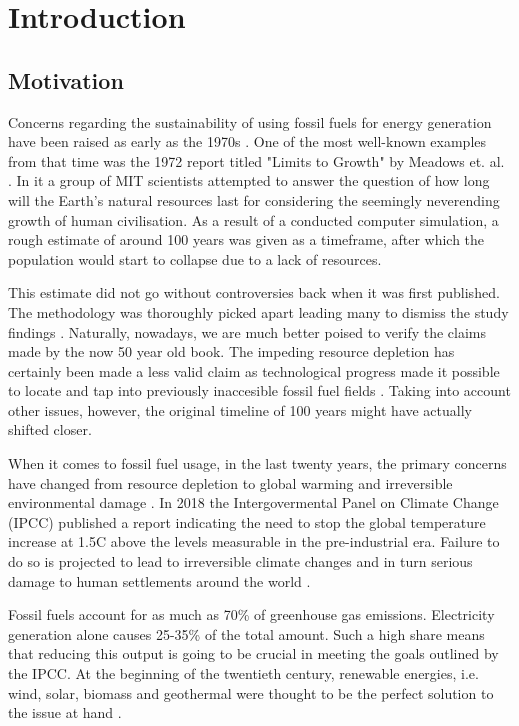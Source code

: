 \section{Introduction}


\subsection{Motivation}


Concerns regarding the sustainability of using fossil fuels for energy generation
have been raised as early as the 1970s \cite{rethinking_resource_depletion}. 
One of the most well-known examples from that time was the 1972 report
titled "Limits to Growth" by Meadows et. al. \cite{limits_to_growth}.
In it a group of MIT scientists attempted to answer the question of
how long will the Earth's natural resources last for
considering the seemingly neverending growth of human civilisation.
As a result of a conducted computer simulation,
a rough estimate of around 100 years was given as a timeframe,
after which the population would start to collapse due to a lack of resources.


This estimate did not go without controversies back when it was first published.
The methodology was thoroughly picked apart leading many to dismiss the study findings
\cite{rethinking_resource_depletion}. Naturally, nowadays, we are much better poised to verify
the claims made by the now 50 year old book. The impeding resource depletion
has certainly been made a less valid claim as technological progress
made it possible to locate and tap into previously inaccesible fossil fuel fields
\cite{shaping_the_global_oil_peak}.
Taking into account other issues, however, the original timeline of 100 years might have
actually shifted closer. 


When it comes to fossil fuel usage, in the last twenty years, 
the primary concerns have changed from resource depletion to global warming 
and irreversible environmental damage \cite{rethinking_resource_depletion}.
In 2018 the Intergovermental Panel on Climate Change (IPCC) published a
report indicating the need to stop the global temperature increase 
at 1.5\degree C above the levels measurable in the pre-industrial era.
Failure to do so is projected to lead to irreversible climate changes and in turn
serious damage to human settlements around the world \cite{ipcc2018}.


Fossil fuels account for as much as 70\% of greenhouse gas emissions.
Electricity generation alone causes 25-35\% 
\cite{global_climate_change} of the total amount.
Such a high share means that reducing this output
is going to be crucial in meeting the goals outlined by the IPCC.
At the beginning of the twentieth century, renewable energies, i.e. 
wind, solar, biomass and geothermal were thought
to be the perfect solution to the issue at hand
\cite{renewable_review_2000}. 


